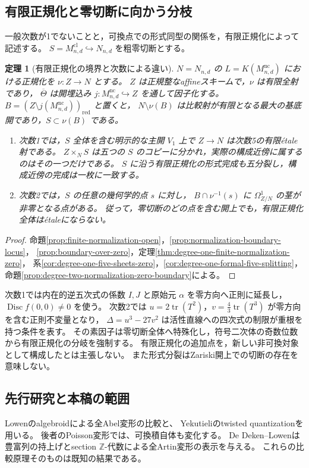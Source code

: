 \documentclass[a4paper,11pt]{ltjsarticle}
\numberwithin{equation}{section}
\theoremstyle{plain}
\newtheorem{theorem}{定理}[section]
\theoremstyle{definition}
\theoremstyle{remark}
\begin{document}
\subsection{有限正規化と零切断に向かう分枝}
一般次数が1でないことと，可換点での形式同型の関係を，有限正規化によって記述する。
$S=M^{\mathrm{cl}}_{n,d}\hookrightarrow N_{n,d}$ を粗零切断とする。
\begin{theorem}[有限正規化の境界と次数による違い]
\label{thm:main-finite-normalization}
$N=N_{n,d}$ の $L=K(M^{\mathrm{nc}}_{n,d})$ における正規化を $\nu:Z\to N$ とする。
$Z$ は正規整なaffineスキームで，$\nu$ は有限全射であり，
$\overline\Theta$ は開埋込み $j:M^{\mathrm{nc}}_{n,d}\hookrightarrow Z$ を通して因子化する。
$B=(Z\setminus j(M^{\mathrm{nc}}_{n,d}))_{\mathrm{red}}$ と置くと，
$N\setminus\nu(B)$ は比較射が有限となる最大の基底開であり，$S\subset\nu(B)$ である。
\begin{enumerate}
\item 次数1では，$S$ 全体を含む明示的な主開 $V_1$ 上で $Z\to N$ は次数5の有限\'{e}tale射である。
  $Z\times_N S$ は五つの $S$ のコピーに分かれ，実際の構成近傍に属するのはその一つだけである。
  $S$ に沿う有限正規化の形式完成も五分裂し，構成近傍の完成は一枚に一致する。
\item 次数2では，$S$ の任意の幾何学的点 $s$ に対し，
  $B\cap\nu^{-1}(s)$ に $\Omega^1_{Z/N}$ の茎が非零となる点がある。
  従って，零切断のどの点を含む開上でも，有限正規化全体は\'{e}taleにならない。
\end{enumerate}
\end{theorem}
\begin{proof}
命題\ref{prop:finite-normalization-open}，\ref{prop:normalization-boundary-locus}，
\ref{prop:boundary-over-zero}，定理\ref{thm:degree-one-finite-normalization-zero}，
系\ref{cor:degree-one-five-sheets-zero}，\ref{cor:degree-one-formal-five-splitting}，
命題\ref{prop:degree-two-normalization-zero-boundary}による。
\end{proof}

次数1では内在的逆五次式の係数 $I,J$ と原始元 $\alpha$ を零方向へ正則に延長し，
$\operatorname{Disc}f(0,0)\ne0$ を使う。
次数2では $u=2\operatorname{tr}(T^2)$，$v=\frac43\operatorname{tr}(T^3)$ が零方向を含む正則不変量となり，
$\Delta=u^3-27v^2$ は活性直線への四次式の制限が重根を持つ条件を表す。
その素因子は零切断全体へ特殊化し，符号二次体の奇数位数から有限正規化の分岐を強制する。
有限正規化の追加点を，新しい非可換対象として構成したとは主張しない。
また形式分裂はZariski開上での切断の存在を意味しない。

\subsection{先行研究と本稿の範囲}
Lowenのalgebroidによる全Abel変形の比較\cite[Theorems 3.14, 3.26]{Lowen2008}と、
Yekutieliのtwisted quantization\cite[Corollaries 7.5, 11.2]{Yekutieli2015}を用いる。
後者のPoisson変形では、可換積自体も変化する。
De Deken--Lowen\cite[Theorem 4.5, Proposition 4.6]{DDL2011}は
豊富列の持上げとsection $\mathbb Z$-代数による全Artin変形の表示を与える。
これらの比較原理そのものは既知の結果である。
\end{document}
